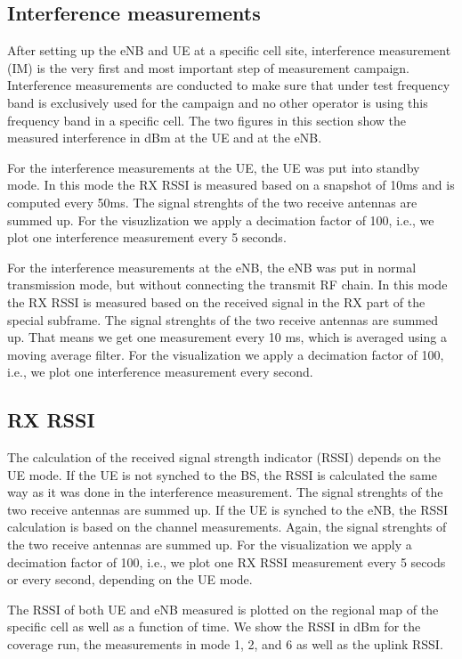 \documentclass[a4paper,10pt]{article}
\begin{document}
\subsection{Interference measurements}

After setting up the eNB and UE at a specific cell site, interference measurement (IM) is the very first and most important step of measurement campaign. Interference measurements are conducted to make sure that under test frequency band is exclusively used for the campaign and no other operator is using this frequency band in a specific cell. The two figures in this section show the measured interference in dBm at the UE and at the eNB. 

For the interference measurements at the UE, the UE was put into standby mode. In this mode the RX RSSI is measured based on a snapshot of 10ms and is computed every 50ms. The signal strenghts of the two receive antennas are summed up. For the visuzlization we apply a decimation factor of 100, i.e., we plot one interference measurement every 5 seconds.

For the interference measurements at the eNB, the eNB was put in normal transmission mode, but without connecting the transmit RF chain. In this mode the RX RSSI is measured based on the received signal in the RX part of the special subframe. The signal strenghts of the two receive antennas are summed up. That means we get one measurement every 10 ms, which is averaged using a moving average filter. For the visualization we apply a decimation factor of 100, i.e., we plot one interference measurement every second. 

\subsection{RX RSSI}

The calculation of the received signal strength indicator (RSSI) depends on the UE mode. If the UE is not synched to the BS, the RSSI is calculated the same way as it was done in the interference measurement. The signal strenghts of the two receive antennas are summed up. If the UE is synched to the eNB, the RSSI calculation is based on the channel measurements. Again, the signal strenghts of the two receive antennas are summed up. For the visualization we apply a decimation factor of 100, i.e., we plot one RX RSSI measurement every 5 secods or every second, depending on the UE mode.

The RSSI of both UE and eNB measured is plotted on the regional map of the specific cell as well as a function of time. We show the RSSI in dBm for the coverage run, the measurements in mode 1, 2, and 6 as well as the uplink RSSI. 
\end{document}

